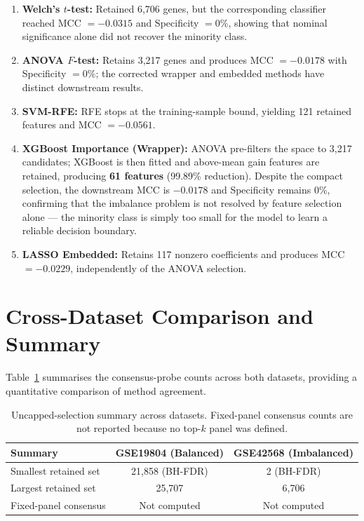 \begin{enumerate}
    \item \textbf{Welch's $t$-test:} Retained 6,706 genes, but the corresponding classifier reached MCC $=-0.0315$ and Specificity $=0\%$, showing that nominal significance alone did not recover the minority class.

    \item \textbf{ANOVA $F$-test:} Retains 3,217 genes and produces MCC $=-0.0178$ with Specificity $=0\%$; the corrected wrapper and embedded methods have distinct downstream results.

    \item \textbf{SVM-RFE:} RFE stops at the training-sample bound, yielding 121 retained features and MCC $=-0.0561$.

    \item \textbf{XGBoost Importance (Wrapper):} ANOVA pre-filters the space to 3,217 candidates; XGBoost is then fitted and above-mean gain features are retained, producing \textbf{61 features} (99.89\% reduction). Despite the compact selection, the downstream MCC is $-0.0178$ and Specificity remains $0\%$, confirming that the imbalance problem is not resolved by feature selection alone — the minority class is simply too small for the model to learn a reliable decision boundary.

    \item \textbf{LASSO Embedded:} Retains 117 nonzero coefficients and produces MCC $=-0.0229$, independently of the ANOVA selection.
\end{enumerate}

\section{Cross-Dataset Comparison and Summary}

Table~\ref{tab:cross_dataset_consensus} summarises the consensus-probe counts across both datasets, providing a quantitative comparison of method agreement.

\begin{table}[H]
\centering
\caption{Uncapped-selection summary across datasets. Fixed-panel consensus counts are not reported because no top-$k$ panel was defined.}
\label{tab:cross_dataset_consensus}
\begin{tabular}{lcc}
\toprule
\textbf{Summary} & \textbf{GSE19804 (Balanced)} & \textbf{GSE42568 (Imbalanced)} \\
\midrule
Smallest retained set & 21,858 (BH-FDR) & 2 (BH-FDR) \\
Largest retained set & 25,707 & 6,706 \\
Fixed-panel consensus & Not computed & Not computed \\
\bottomrule
\end{tabular}
\end{table}


